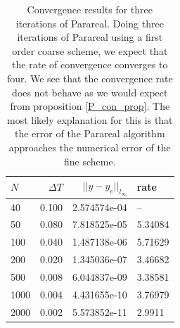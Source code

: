\begin{table}[h]
\centering
\caption{Convergence results for three iterations of Parareal. Doing three iterations of Parareal using a first order coarse scheme, we expect that the rate of convergence converges to four. We see that the convergence rate does not behave as we would expect from proposition \ref{P_con_prop}. The most likely explanation for this is that the error of the Parareal algorithm approaches the numerical error of the fine scheme. }
\label{par_con4}
\begin{tabular}{lrrl}
\toprule
{}$N$ &      $\Delta T$ &      $||y-y_e||_{l_{\infty}}$  &     rate \\
\midrule
40   &  0.100 &  2.574574e-04 &       -- \\
50   &  0.080 &  7.818525e-05 &  5.34084 \\
100  &  0.040 &  1.487138e-06 &  5.71629 \\
200  &  0.020 &  1.345036e-07 &  3.46682 \\
500  &  0.008 &  6.044837e-09 &  3.38581 \\
1000 &  0.004 &  4.431655e-10 &  3.76979 \\
2000 &  0.002 &  5.573852e-11 &   2.9911 \\
\bottomrule
\end{tabular}
\end{table}

